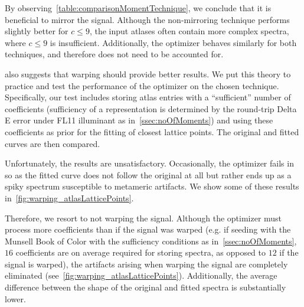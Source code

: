 By observing~\cref{table:comparisonMomentTechnique}, we conclude that it is beneficial to mirror the signal. Although the non-mirroring technique performs slightly better for $c \le 9$, the input atlases often contain more complex spectra, where $c \le 9$ is insufficient. Additionally, the optimizer behaves similarly for both techniques, and therefore does not need to be accounted for.

 also suggests that warping should provide better results. We put this theory to practice and test the performance of the optimizer on the chosen technique. Specifically, our test includes storing atlas entries with a ``sufficient'' number of coefficients (sufficiency of a representation is determined by the round-trip Delta E error under FL11 illuminant as in~\cref{ssec:noOfMoments}) and using these coefficients as prior for the fitting of closest lattice points. The original and fitted curves are then compared.

Unfortunately, the results are unsatisfactory. Occasionally, the optimizer fails in so as the fitted curve does not follow the original at all but rather ends up as a spiky spectrum susceptible to metameric artifacts. We show some of these results in~\cref{fig:warping_atlasLatticePoints}.

Therefore, we resort to not warping the signal. Although the optimizer must process more coefficients than if the signal was warped (e.g. if seeding with the Munsell Book of Color with the sufficiency conditions as in~\cref{ssec:noOfMoments}, $16$ coefficients are on average required for storing spectra, as opposed to $12$ if the signal is warped), the artifacts arising when warping the signal are completely eliminated (see~\cref{fig:warping_atlasLatticePoints}). Additionally, the average difference between the shape of the original and fitted spectra is substantially lower.

